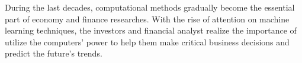 During the last decades, computational methods gradually become the essential part of economy and finance researches. With the rise of attention on machine learning techniques, the investors and financial analyst realize the importance of utilize the computers' power to help them make critical business decisions and predict the future's trends.